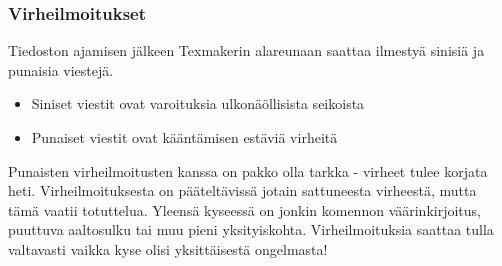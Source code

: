 \begin{frame}
    \frametitle{Virheilmoitukset}
    Tiedoston ajamisen jälkeen Texmakerin alareunaan saattaa ilmestyä sinisiä ja punaisia viestejä.\pause
    \begin{itemize}[<+->]
        \item Siniset viestit ovat varoituksia ulkonäöllisista seikoista
        \item Punaiset viestit ovat kääntämisen estäviä virheitä
    \end{itemize}\pause
    Punaisten virheilmoitusten kanssa on pakko olla tarkka - virheet tulee korjata heti. 
    \vaihto
    \pause
    Virheilmoituksesta on pääteltävissä jotain sattuneesta virheestä, mutta tämä vaatii totuttelua. 
    \pause Yleensä kyseessä on jonkin komennon väärinkirjoitus, puuttuva aaltosulku tai muu pieni yksityiskohta.
    \vaihto
    \pause Virheilmoituksia saattaa tulla valtavasti vaikka kyse olisi yksittäisestä ongelmasta!
\end{frame}
